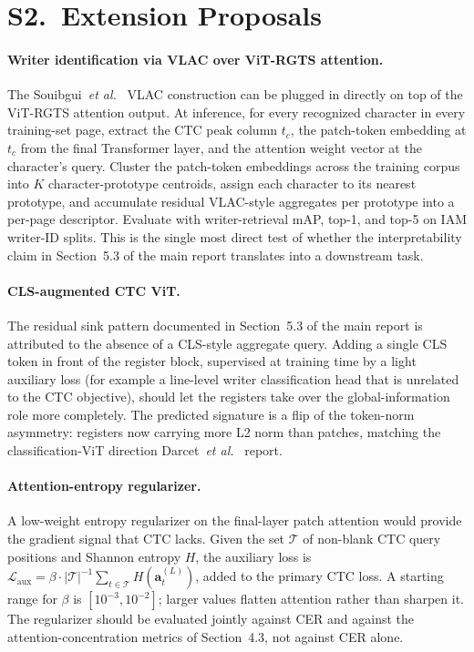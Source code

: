 \documentclass[10pt,a4paper]{article}
\newcommand{\etal}{\textit{et al.}}
\begin{document}
\section*{S2.~Extension Proposals}

\paragraph{Writer identification via VLAC over ViT-RGTS attention.} The Souibgui~\etal~\cite{souibgui2022vlac} VLAC construction can be plugged in directly on top of the ViT-RGTS attention output. At inference, for every recognized character in every training-set page, extract the CTC peak column $t_c$, the patch-token embedding at $t_c$ from the final Transformer layer, and the attention weight vector at the character's query. Cluster the patch-token embeddings across the training corpus into $K$ character-prototype centroids, assign each character to its nearest prototype, and accumulate residual VLAC-style aggregates per prototype into a per-page descriptor. Evaluate with writer-retrieval mAP, top-1, and top-5 on IAM writer-ID splits. This is the single most direct test of whether the interpretability claim in Section~5.3 of the main report translates into a downstream task.

\paragraph{CLS-augmented CTC ViT.} The residual sink pattern documented in Section~5.3 of the main report is attributed to the absence of a CLS-style aggregate query. Adding a single CLS token in front of the register block, supervised at training time by a light auxiliary loss (for example a line-level writer classification head that is unrelated to the CTC objective), should let the registers take over the global-information role more completely. The predicted signature is a flip of the token-norm asymmetry: registers now carrying more L2 norm than patches, matching the classification-ViT direction Darcet~\etal~\cite{darcet2024registers} report.

\paragraph{Attention-entropy regularizer.} A low-weight entropy regularizer on the final-layer patch attention would provide the gradient signal that CTC lacks. Given the set $\mathcal{T}$ of non-blank CTC query positions and Shannon entropy $H$, the auxiliary loss is $\mathcal{L}_{\mathrm{aux}} = \beta \cdot |\mathcal{T}|^{-1} \sum_{t \in \mathcal{T}} H(\mathbf{a}_t^{(L)})$, added to the primary CTC loss. A starting range for $\beta$ is $[10^{-3}, 10^{-2}]$; larger values flatten attention rather than sharpen it. The regularizer should be evaluated jointly against CER and against the attention-concentration metrics of Section~4.3, not against CER alone.
\end{document}
